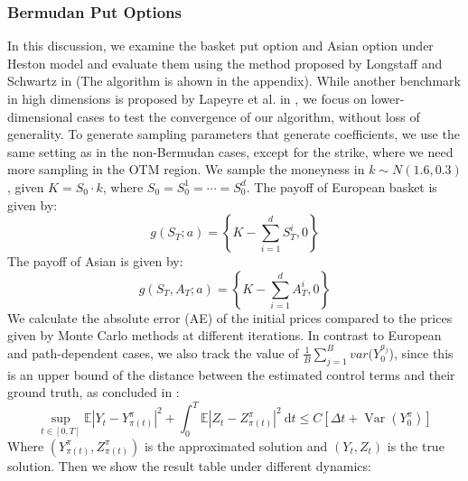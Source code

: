 \documentclass[11pt,a4paper]{article}
\theoremstyle{remark}
\begin{document}
	\subsubsection{Bermudan Put Options}
	In this discussion, we examine the basket put option and Asian option under Heston model and evaluate them using the method proposed by Longstaff and Schwartz in \cite{longstaff2001valuing} (The algorithm is ahown in the appendix). While another benchmark in high dimensions is proposed by Lapeyre et al. in \cite{lapeyre2021neural}, we focus on lower-dimensional cases to test the convergence of our algorithm, without loss of generality. To generate sampling parameters that generate coefficients, we use the same setting as in the non-Bermudan cases, except for the strike, where we need more sampling in the OTM region. We sample the moneyness in $k \sim N(1.6, 0.3)$, given $K = S_0 \cdot k$, where $S_0 = S_0^1 = \cdots = S_0^d$. The payoff of European basket is given by:
	\begin{equation*}
		g(S_T; a) = \left\{K-\sum_{i=1}^d S_T^i, 0\right\}
	\end{equation*}
	The payoff of Asian is given by:
	\begin{equation*}
		g(S_T, A_T; a) = \left\{K-\sum_{i=1}^d A_T^i, 0\right\}
	\end{equation*}
	We calculate the absolute error (AE) of the initial prices compared to the prices given by Monte Carlo methods at different iterations. In contrast to European and path-dependent cases, we also track the value of $\frac{1}{B}\sum_{j=1}^Bvar(Y^{a_j}_0$), since this is an upper bound of the distance between the estimated control terms and their ground truth, as concluded in \cite{gao2022convergence}:
	\begin{equation*}
		\sup _{t \in[0, T]} \mathbb{E}\left|Y_t-Y_{\pi(t)}^\pi\right|^2+\int_0^T \mathbb{E}\left|Z_t-Z_{\pi(t)}^\pi\right|^2 \mathrm{~d} t \leq C\left[\Delta t+\operatorname{Var}\left(Y_0^\pi\right)\right]
	\end{equation*}
	Where $(Y_{\pi(t)}^\pi, Z_{\pi(t)}^\pi)$ is the approximated solution and $(Y_{t}, Z_{t})$ is the true solution. Then we show the result table under different dynamics:
\end{document}
